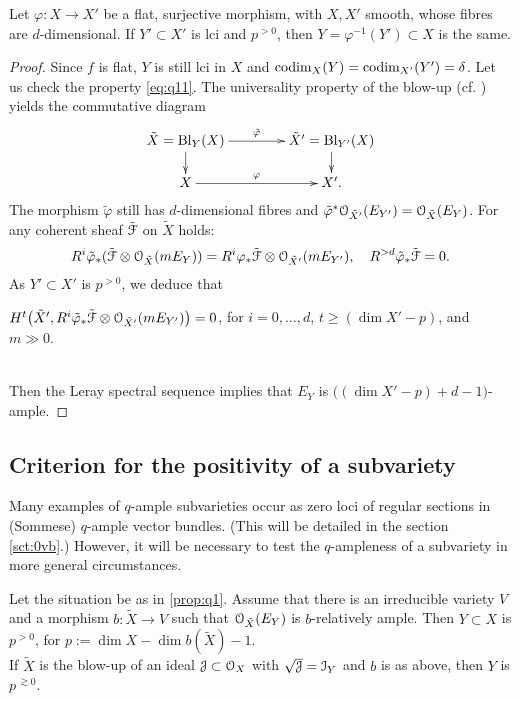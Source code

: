 \documentclass[11pt,reqno]{amsart}
\let\euf\EuScript
\let\tld\tilde
\let\vphi\varphi
\numberwithin{equation}{section}
\numberwithin{figure}{section}
\let\ges\geqslant
\begin{document}
\begin{m-lemma}\label{lm:pull-back}
Let $\vphi:X\to X'$ be a flat, surjective morphism, with $X,X'$ smooth, 
whose fibres are $d$-dimensional. If $Y'\subset X'$ is lci and $p^{{>0}}$, 
then $Y=\vphi^{-1}(Y')\subset X$ is the same. 
\end{m-lemma}

\begin{proof}
Since $f$ is flat, $Y$ is still lci in $X$ and ${{\rm codim}}_X(Y)={{\rm codim}}_{X'}(Y')=\delta$. 
Let us check the property \eqref{eq:q11}. The universality property of the blow-up 
(cf. \cite[Ch. II, Corollary 7.15]{hart-ag})  yields the commutative diagram 
$$
\xymatrix@R=1.5em@C=4em{
\tld X={{\rm Bl}}_{Y}(X)\ar[d]\ar[r]^-{\tld\vphi}&\tld X'={{\rm Bl}}_{Y'}(X)\ar[d]
\\
X\ar[r]^-\vphi&X'.
}
$$
The morphism $\tld\vphi$ still has $d$-dimensional fibres and 
$\tld\vphi^*{{\euf O}}_{\tld X'}(E_{Y'})={{\euf O}}_{\tld X}(E_Y)$. 
For any coherent sheaf $\tld{{\euf F}}$ on $\tld X$ holds: 
$$
R^i\tld\vphi_*(\tld{{\euf F}}\otimes{{\euf O}}_{\tld X}(mE_Y))
=R^i\vphi_*\tld{{\euf F}}\otimes{{\euf O}}_{\tld X'}(mE_{Y'}), \quad 
R^{>d}\tld\vphi_*\tld{{\euf F}}=0.
$$ 
As $Y'\subset X'$ is $p^{{>0}}$, we deduce that 
\\[1ex] \centerline{
$H^t\big(\tld X',R^i\tld\vphi_*\tld{{\euf F}}\otimes{{\euf O}}_{\tld X'}(mE_{Y'})\big)=0$, 
for $i=0,\ldots,d$, $t\ges(\dim X'-p)$, and $m\gg0$. 
}\\[1ex]
Then the Leray spectral sequence implies that $E_Y$ is 
$\big((\dim X'-p)+d-1\big)$-ample. 
\end{proof}

\subsection{Criterion for the positivity of a subvariety}\label{ssct:+}

Many examples of $q$-ample subvarieties occur as zero loci of regular sections in 
(Sommese) $q$-ample vector bundles. 
(This will be detailed in the section \ref{sct:0vb}.)  However, it will be necessary to test 
the $q$-ampleness of a subvariety in more general circumstances. 

\begin{m-proposition}\label{prop:x-b}
Let the situation be as in \ref{prop:q1}. Assume that there is an irreducible variety $V$ 
and a morphism $b:\tld X\to V$ such that ${{\euf O}}_{\tld X}(E_Y)$ is $b$-relatively ample. Then $Y\subset X$ is $p^{{>0}}$, for $p:=\dim X-\dim b(\tld X)-1$.\\ 
If $\tld X$ is the blow-up of an ideal ${{\euf J}}\subset{{\euf O}}_X$ with $\sqrt{{\euf J}}={{\euf I}}_Y$ 
and $b$ is as above, then $Y$ is $p^{{\,\gtrsim0}}$. 
\end{m-proposition}
\end{document}
